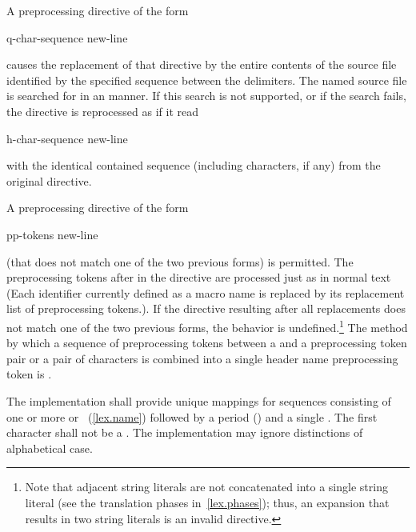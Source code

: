 \pnum
{}%
A preprocessing directive of the form

\begin{ncsimplebnf}
q-char-sequence new-line
\end{ncsimplebnf}

causes the replacement of that
directive by the entire contents of the
source file identified by the specified sequence between the
delimiters.
The named source file is searched for in an
manner.
If this search is not supported,
or if the search fails,
the directive is reprocessed as if it read

\begin{ncsimplebnf}
h-char-sequence\terminal{>} new-line
\end{ncsimplebnf}

with the identical contained sequence (including
\tcode{>}
characters, if any) from the original directive.

\pnum
A preprocessing directive of the form

\begin{ncsimplebnf}
 pp-tokens new-line
\end{ncsimplebnf}

(that does not match one of the two previous forms) is permitted.
The preprocessing tokens after
in the directive are processed just as in normal text
(Each identifier currently defined as a macro name is replaced by its
replacement list of preprocessing tokens.).
If the directive resulting after all replacements does not match
one of the two previous forms, the behavior is
undefined.\footnote{Note that adjacent string literals are not concatenated into
a single string literal
(see the translation phases in~\ref{lex.phases});
thus, an expansion that results in two string literals is an
invalid directive.}
The method by which a sequence of preprocessing tokens between a
\tcode{<}
and a
\tcode{>}
preprocessing token pair or a pair of
characters is combined into a single header name
preprocessing token is .

\pnum
The implementation shall provide unique mappings for
sequences consisting of one or more
 or ~(\ref{lex.name})
followed by a period
()
and a single
.
The first character shall not be a .
The implementation may ignore distinctions of alphabetical case.

